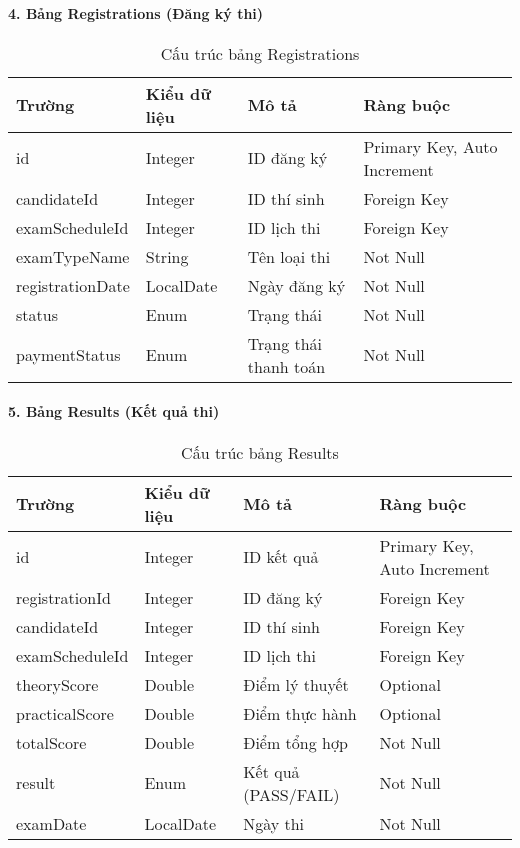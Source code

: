 \documentclass[12pt,a4paper]{article}
\begin{document}
\paragraph{4. Bảng Registrations (Đăng ký thi)}
\begin{table}[H]
\centering
\begin{tabular}{|l|l|l|l|}
\hline
\textbf{Trường} & \textbf{Kiểu dữ liệu} & \textbf{Mô tả} & \textbf{Ràng buộc} \\
\hline
id & Integer & ID đăng ký & Primary Key, Auto Increment \\
\hline
candidateId & Integer & ID thí sinh & Foreign Key \\
\hline
examScheduleId & Integer & ID lịch thi & Foreign Key \\
\hline
examTypeName & String & Tên loại thi & Not Null \\
\hline
registrationDate & LocalDate & Ngày đăng ký & Not Null \\
\hline
status & Enum & Trạng thái & Not Null \\
\hline
paymentStatus & Enum & Trạng thái thanh toán & Not Null \\
\hline
\end{tabular}
\caption{Cấu trúc bảng Registrations}
\label{tab:registrations_structure}
\end{table}

\paragraph{5. Bảng Results (Kết quả thi)}
\begin{table}[H]
\centering
\begin{tabular}{|l|l|l|l|}
\hline
\textbf{Trường} & \textbf{Kiểu dữ liệu} & \textbf{Mô tả} & \textbf{Ràng buộc} \\
\hline
id & Integer & ID kết quả & Primary Key, Auto Increment \\
\hline
registrationId & Integer & ID đăng ký & Foreign Key \\
\hline
candidateId & Integer & ID thí sinh & Foreign Key \\
\hline
examScheduleId & Integer & ID lịch thi & Foreign Key \\
\hline
theoryScore & Double & Điểm lý thuyết & Optional \\
\hline
practicalScore & Double & Điểm thực hành & Optional \\
\hline
totalScore & Double & Điểm tổng hợp & Not Null \\
\hline
result & Enum & Kết quả (PASS/FAIL) & Not Null \\
\hline
examDate & LocalDate & Ngày thi & Not Null \\
\hline
\end{tabular}
\caption{Cấu trúc bảng Results}
\label{tab:results_structure}
\end{table}
\end{document}
